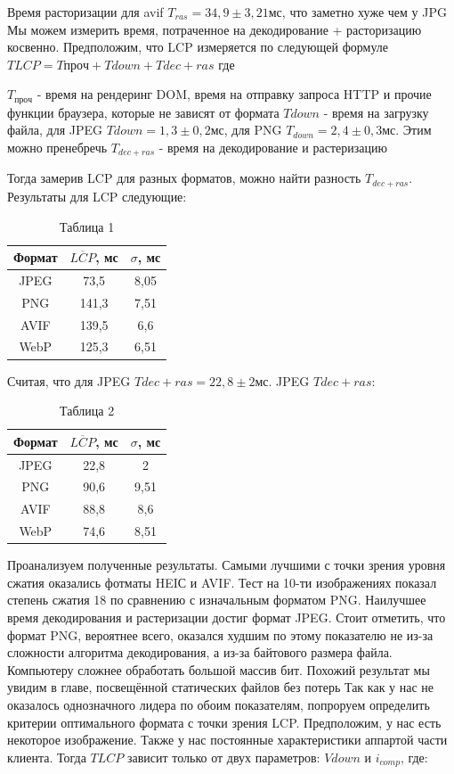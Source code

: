 \documentclass[12pt]{article}
\begin{document}
Время расторизации для avif $T_{ras}=34,9 \pm 3,21мс$, что заметно хуже чем у JPG
Мы можем измерить время, потраченное на декодирование + расторизацию косвенно. Предположим, что LCP измеряется по следующей формуле
$
T{LCP} = T{проч} + T{down} + T{dec+ras}
$
где

$T_{проч}$ - время на рендеринг DOM, время на отправку запроса HTTP и прочие функции браузера, которые не зависят от формата
$T{down}$ - время на загрузку файла, для JPEG $T{down} = 1,3 \pm 0,2 мс$, для PNG $T_{down} = 2,4 \pm 0,3 мс$. Этим можно пренебречь
$T_{dec+ras}$ - время на декодирование и растеризацию

Тогда замерив LCP для разных форматов, можно найти разность $T_{dec+ras}$.
Результаты для LCP следующие:
\begin{table}[h!]
\centering
\caption{Таблица 1}
\begin{tabular}{|c|c|c|}
\hline
Формат & $\overline{LCP}$, мс & $\sigma$, мс \\
\hline
JPEG & 73,5 & 8,05 \\
\hline
PNG & 141,3 & 7,51 \\
\hline
AVIF & 139,5 & 6,6 \\
\hline
WebP & 125,3 & 6,51 \\
\hline
\end{tabular}
\end{table}

Считая, что для JPEG $T{dec+ras} = 22,8 \pm 2мс$. JPEG $T{dec+ras}$:
\begin{table}[h!]
\centering
\caption{Таблица 2}
\begin{tabular}{|c|c|c|}
\hline
Формат & $\overline{LCP}$, мс & $\sigma$, мс \\
\hline
JPEG & 22,8 & 2 \\
\hline
PNG & 90,6 & 9,51 \\
\hline
AVIF & 88,8 & 8,6 \\
\hline
WebP & 74,6 & 8,51 \\
\hline
\end{tabular}
\end{table}

Проанализуем полученные результаты. Самыми лучшими с точки зрения уровня сжатия оказались фотматы HEIС и AVIF.
Тест на 10-ти изображениях показал степень сжатия 18 по сравнению с изначальным форматом PNG.
Наилучшее время декодирования и растеризации достиг формат JPEG. Стоит отметить, что формат PNG, вероятнее всего, оказался худшим по этому показателю не из-за сложности алгоритма декодирования, а из-за байтового размера файла. Компьютеру сложнее обработать большой массив бит. Похожий результат мы увидим в главе, посвещённой статических файлов без потерь
Так как у нас не оказалось однозначного лидера по обоим показателям, попроруем определить критерии оптимального формата с точки зрения LCP. Предположим, у нас есть некоторое изображение.
Также у нас постоянные характеристики аппартой части клиента. Тогда $T{LCP}$ зависит только от двух параметров: $V{down}$ и $i_{comp}$, где:
\end{document}
